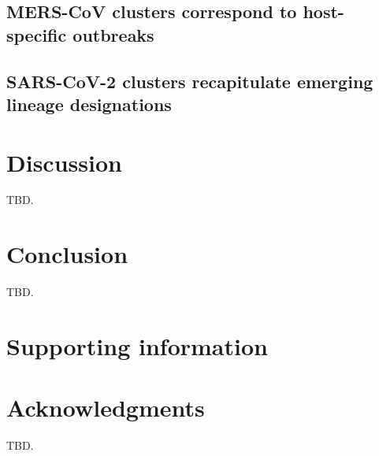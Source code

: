 \documentclass[10pt,letterpaper]{article}
\begin{document}
\subsection*{MERS-CoV clusters correspond to host-specific outbreaks}

\subsection*{SARS-CoV-2 clusters recapitulate emerging lineage designations}

\section*{Discussion}

TBD.

\section*{Conclusion}

TBD.

\section*{Supporting information}


\section*{Acknowledgments}
TBD.

\nolinenumbers

%
%
%








\end{document}
